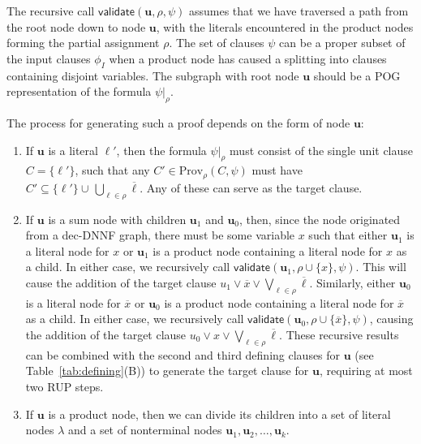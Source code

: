 \documentclass[letterpaper,USenglish,cleveref, autoref, thm-restate]{lipics-v2021}
\newcommand{\obar}[1]{\overline{#1}}
\newcommand{\lit}{\ell}
\newcommand{\assign}{\alpha}
\newcommand{\passign}{\rho}
\newcommand{\validate}{\textsf{validate}}
\newcommand{\prov}{\textrm{Prov}}
\newcommand{\inputformula}{\phi_I}
\newcommand{\makenode}[1]{\mathbf{#1}}
\newcommand{\nodeu}{\makenode{u}}
\newcommand{\simplify}[2]{#1|_{#2}}
\begin{document}
The recursive call $\validate(\nodeu, \passign, \psi)$ assumes that we have
traversed a path from the root node down to node $\nodeu$, with the
literals encountered in the product nodes forming the partial
assignment $\passign$.  The set of clauses $\psi$ can be a proper
subset of the input clauses $\inputformula$ when a product node has caused
a splitting into clauses containing disjoint variables.
The subgraph with root node $\nodeu$ should be a POG representation of the formula
$\simplify{\psi}{\passign}$.

The process for generating such a proof depends on the form of node $\nodeu$:
\begin{enumerate}
\item If $\nodeu$ is a literal $\lit'$, then the formula
  $\simplify{\psi}{\passign}$ must consist of the single unit clause
  $C = \{\lit'\}$, such that any $C' \in \prov_{\passign}(C, \psi)$ must have $C' \subseteq \{ \lit' \} \cup\, \bigcup_{\lit \in \passign} \obar{\lit}$.
  Any of these can
  serve as the target clause.
\item If $\nodeu$ is a sum node with children $\nodeu_1$ and $\nodeu_0$,
  then, since the node originated from a dec-DNNF graph, there must be
  some variable $x$ such that either $\nodeu_1$ is a literal node for $x$ or $\nodeu_1$ is a
  product node containing a literal node for $x$ as a child.  In either case, we
  recursively call $\validate(\nodeu_1, \passign \cup \{ x \}, \psi)$.
  This will cause the addition of the target clause
  $u_1 \lor \obar{x} \lor \bigvee_{\lit \in \passign} \obar{\lit}$.
Similarly, either $\nodeu_0$ is a literal node for $\obar{x}$ or $\nodeu_0$ is a product node containing a literal node for $\obar{x}$ as
  a child.  In either case, we recursively call $\validate(\nodeu_0, \passign \cup \{ \obar{x} \}, \psi)$,
  causing the addition of the target clause
  $u_0 \lor x \lor \bigvee_{\lit \in \passign} \obar{\lit}$.
  These recursive results can be combined with the second and third defining clauses for $\nodeu$
(see Table~\ref{tab:defining}(B))
  to generate the target clause for $\nodeu$, requiring at most two RUP steps.
\item If $\nodeu$ is a product node, then we can divide its children
  into a set of literal nodes $\lambda$ and a set of nonterminal nodes $\nodeu_1, \nodeu_2, \ldots, \nodeu_k$.
  \begin{enumerate}

\end{enumerate}
\end{enumerate}
\end{document}
